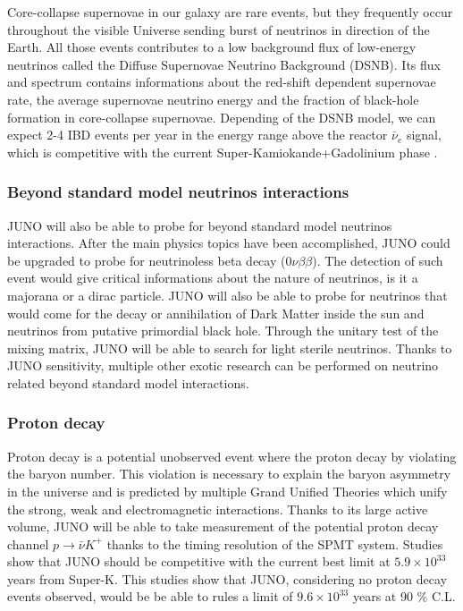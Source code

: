 \documentclass[../main.tex]{subfiles}
\begin{document}
Core-collapse supernovae in our galaxy are rare events, but they frequently occur throughout the visible Universe sending burst of neutrinos in direction of the Earth. All those events contributes to a low background flux of low-energy neutrinos called the Diffuse Supernovae Neutrino Background (DSNB). Its flux and spectrum contains informations about the red-shift dependent supernovae rate, the average supernovae neutrino energy and the fraction of black-hole formation in core-collapse supernovae. Depending of the DSNB model, we can expect 2-4 IBD events per year in the energy range above the reactor $\bar{\nu}_e$ signal, which is competitive with the current Super-Kamiokande+Gadolinium phase \cite{collaboration_diffuse_2021}.

\subsubsection{Beyond standard model neutrinos interactions}

JUNO will also be able to probe for beyond standard model neutrinos interactions. After the main physics topics have been accomplished, JUNO could be upgraded to probe for neutrinoless beta decay ($0\nu\beta\beta$). The detection of such event would give critical informations about the nature of neutrinos, is it a majorana or a dirac particle. JUNO will also be able to probe for neutrinos that would come for the decay or annihilation of Dark Matter inside the sun and neutrinos from putative primordial black hole.
Through the unitary test of the mixing matrix, JUNO will be able to search for light sterile neutrinos.
Thanks to JUNO sensitivity, multiple other exotic research can be performed on neutrino related beyond standard model interactions.

\subsubsection{Proton decay}

Proton decay is a potential unobserved event where the proton decay by violating the baryon number. This violation is necessary to explain the baryon asymmetry in the universe and is predicted by multiple Grand Unified Theories which unify the  strong, weak and electromagnetic interactions.
Thanks to its large active volume, JUNO will be able to take measurement of the potential proton decay channel $p \rightarrow \bar{\nu}K^+$ \cite{juno_collaboration_juno_2023} thanks to the timing resolution of the SPMT system. Studies show that JUNO should be competitive with the current best limit at $5.9 \times 10^{33}$ years from Super-K. This studies show that JUNO, considering no proton decay events observed, would be be able to rules a limit of $9.6 \times 10^{33}$ years at 90 \% C.L.
\end{document}
